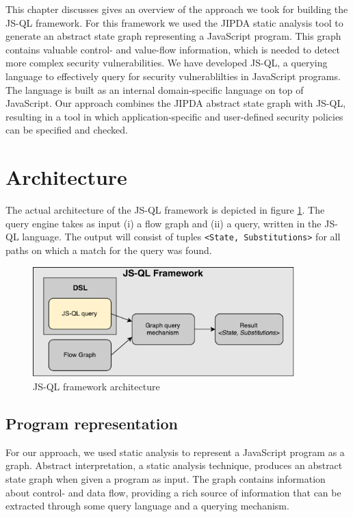 This chapter discusses gives an overview of the approach we took for building the JS-QL framework. For this framework we used the JIPDA static analysis tool to generate an abstract state graph representing a JavaScript program. This graph contains valuable control- and value-flow information, which is needed to detect more complex security vulnerabilities. We have developed JS-QL, a querying language to effectively query for security vulnerablilties in JavaScript programs. The language is built as an internal domain-specific language on top of JavaScript. Our approach combines the JIPDA abstract state graph with JS-QL, resulting in a tool in which application-specific and user-defined security policies can be specified and checked.

\section{Architecture}
\label{sec:Architecture}

The actual architecture of the JS-QL framework is depicted in figure \ref{fig:architecture}. The query engine takes as input (i) a flow graph and (ii) a query, written in the JS-QL language. The output will consist of tuples \texttt{<State, Substitutions>} for all paths on which a match for the query was found.

\begin{figure}
    \centering
      \includegraphics[width=0.9\textwidth]{images/Architecture} 
      \caption{JS-QL framework architecture}
    \label{fig:architecture}
\end{figure}

\subsection*{Program representation}

For our approach, we used static analysis to represent a JavaScript program as a graph. Abstract interpretation, a static analysis technique, produces an abstract state graph when given a program as input. The graph contains information about control- and data flow, providing a rich source of information that can be extracted through some query language and a querying mechanism. 

